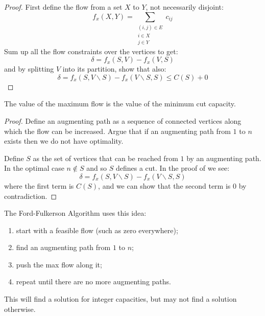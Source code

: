 \documentclass[../Main.tex]{subfiles}
\begin{document}
\begin{proof}
    First define the flow from a set $X$ to $Y$, not necessarily disjoint:
    \begin{equation*}
        f_x(X, Y) = \sum_{\substack{(i, j) \in E\\i \in X\\j \in Y}} c_{ij}
    \end{equation*}
    Sum up all the flow constraints over the vertices to get:
    \begin{equation*}
        \delta = f_x(S, V) - f_x(V, S)
    \end{equation*}
    and by splitting $V$ into its partition, show that also:
    \begin{equation*}
        \delta = f_x(S, V\backslash S) - f_x(V\backslash S, S) \leq C(S) + 0
    \end{equation*}
\end{proof}
\begin{theorem}
    The value of the maximum flow is the value of the minimum cut capacity.
    \label{thmMaxFlowMinCut}
\end{theorem}
\begin{proof}
    Define an augmenting path as a sequence of connected vertices along which the flow can be increased. Argue that if an augmenting path from $1$ to $n$ exists then we do not have optimality.

    Define $S$ as the set of vertices that can be reached from $1$ by an augmenting path. In the optimal case $n \notin S$ and so $S$ defines a cut. In the proof of  we see:
    \begin{equation*}
        \delta = f_x(S, V\backslash S) - f_x(V\backslash S, S)
    \end{equation*}
    where the first term is $C(S)$, and we can show that the second term is $0$ by contradiction.
\end{proof}
The Ford-Fulkerson Algorithm uses this idea:
\begin{enumerate}
    \item start with a feasible flow (such as zero everywhere);
    \item find an augmenting path from $1$ to $n$;
    \item push the max flow along it;
    \item repeat until there are no more augmenting paths.
\end{enumerate}
This will find a solution for integer capacities, but may not find a solution otherwise.
\end{document}
